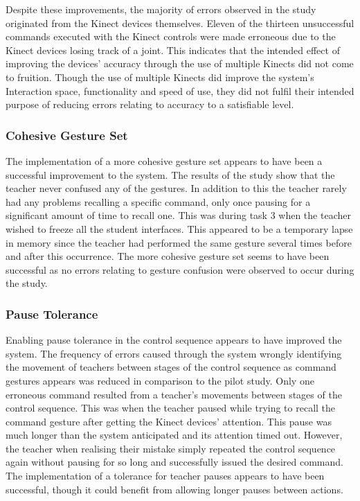 \documentclass[link]{IWCOMP}
\begin{document}
Despite these improvements, the majority of errors observed in the study originated from the Kinect devices themselves.
Eleven of the thirteen unsuccessful commands executed with the Kinect controls were made erroneous due to the Kinect devices losing track of a joint.
This indicates that the intended effect of improving the devices' accuracy through the use of multiple Kinects did not come to fruition.
Though the use of multiple Kinects did improve the system's Interaction space, functionality and speed of use, they did not fulfil their intended purpose of reducing errors relating to accuracy to a satisfiable level.

\subsubsection{Cohesive Gesture Set}
\label{subsubsec:discussionSuccessCohesiveGestureSet}

The implementation of a more cohesive gesture set appears to have been a successful improvement to the system.
The results of the study show that the teacher never confused any of the gestures.
In addition to this the teacher rarely had any problems recalling a specific command, only once pausing for a significant amount of time to recall one.
This was during task 3 when the teacher wished to freeze all the student interfaces.
This appeared to be a temporary lapse in memory since the teacher had performed the same gesture several times before and after this occurrence.
The more cohesive gesture set seems to have been successful as no errors relating to gesture confusion were observed to occur during the study.

\subsubsection{Pause Tolerance}
\label{subsubsec:discussionSuccessPauseTolerance}

Enabling pause tolerance in the control sequence appears to have improved the system.
The frequency of errors caused through the system wrongly identifying the movement of teachers between stages of the control sequence as command gestures appears was reduced in comparison to the pilot study.
Only one erroneous command resulted from a teacher's movements between stages of the control sequence.
This was when the teacher paused while trying to recall the command gesture after getting the Kinect devices' attention.
This pause was much longer than the system anticipated and its attention timed out.
However, the teacher when realising their mistake simply repeated the control sequence again without pausing for so long and successfully issued the desired command.
The implementation of a tolerance for teacher pauses appears to have been successful, though it could benefit from allowing longer pauses between actions.
\end{document}
